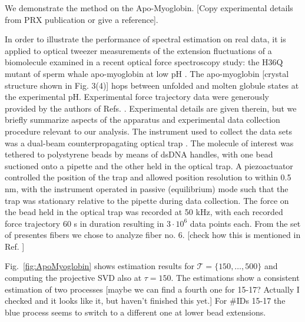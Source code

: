 \documentclass[aps,pre,twocolumn,nofootinbib,superscriptaddress,linenumbers]{revtex4-1}
\begin{document}
We demonstrate the method on the Apo-Myoglobin. {[}Copy experimental
details from PRX publication or give a reference{]}.

In order to illustrate the performance of spectral estimation on real
data, it is applied to optical tweezer measurements of the extension
fluctuations of a biomolecule examined in a recent optical force spectroscopy
study: the H36Q mutant of sperm whale apo-myoglobin at low pH \cite{Elms:2012jb}.
The apo-myoglobin {[}crystal structure shown in Fig. 3(4){]} hops
between unfolded and molten globule states at the experimental pH.
Experimental force trajectory data were generously provided by the
authors of Refs. \cite{Elms:2012jb}. Experimental details are given
therein, but we briefly summarize aspects of the apparatus and experimental
data collection procedure relevant to our analysis. The instrument
used to collect the data sets was a dual-beam counterpropagating optical
trap \cite{Bustamante:wb}. The molecule of interest was tethered
to polystyrene beads by means of dsDNA handles, with one bead suctioned
onto a pipette and the other held in the optical trap. A piezoactuator
controlled the position of the trap and allowed position resolution
to within 0.5 nm, with the instrument operated in passive (equilibrium)
mode such that the trap was stationary relative to the pipette during
data collection. The force on the bead held in the optical trap was
recorded at 50 kHz, with each recorded force trajectory 60 s in duration
resulting in $3\cdot10^{6}$ data points each. From the set of presentes
fibers we chose to analyze fiber no. 6. {[}check how this is mentioned
in Ref. \cite{Elms:2012jb}{]}

Fig.~\ref{fig:ApoMyoglobin} shows estimation results for $\mathcal{T}=\{150,\ldots,500\}$
and computing the projective SVD also at $\tau=150$. The estimations
show a consistent estimation of two processes {[}maybe we can find
a fourth one for 15-17? Actually I checked and it looks like it, but
haven't finished this yet.{]} For \#IDs 15-17 the blue process seems
to switch to a different one at lower bead extensions. 
\end{document}
